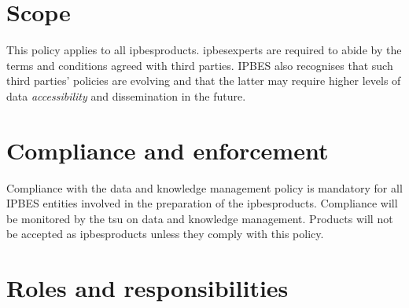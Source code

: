 \documentclass{article}
\begin{document}
\section{Scope}

This policy applies to all \glspl{ipbesproduct}. \glspl{ipbesexpert} are required to abide by the terms and conditions agreed with third parties. IPBES also recognises that such third parties’ policies are evolving and that the latter may require higher levels of \gls{data} \textit{accessibility} and dissemination in the future.

\section{Compliance and enforcement}

Compliance with the data and knowledge management policy is mandatory for all IPBES entities involved in the preparation of the \glspl{ipbesproduct}. Compliance will be monitored by the \gls{tsu} on data and knowledge management. Products will not be accepted as \glspl{ipbesproduct} unless they comply with this policy.

\section{Roles and responsibilities}
\end{document}
